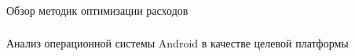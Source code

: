 \subsubsection{} Обзор методик оптимизации расходов
\label{sec:analysis:literature:optimization}


\subsubsection{} Анализ операционной системы Android в качестве целевой платформы
\label{sec:analysis:literature:android}

